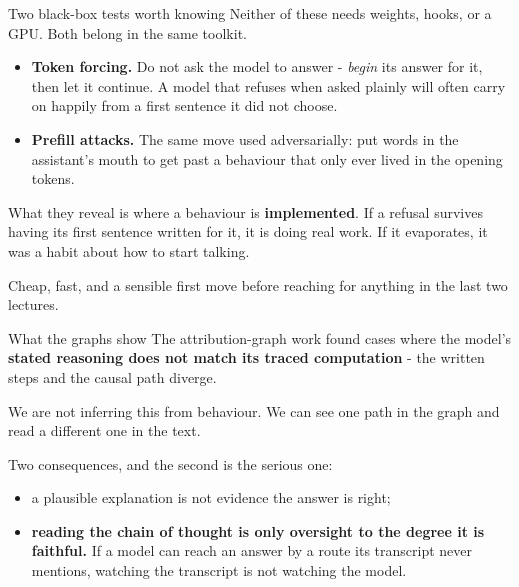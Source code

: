 \documentclass[aspectratio=169]{beamer}
\newcommand{\keybox}[1]{%
  \begin{tcolorbox}[colback=armblue!8, colframe=armblue, boxrule=0.6pt, arc=2pt]
  #1
  \end{tcolorbox}}
\begin{document}
\begin{frame}{Two black-box tests worth knowing}
  \vspace{0.5em}
  Neither of these needs weights, hooks, or a GPU. Both belong in the same toolkit.

  \vspace{0.7em}
  \begin{itemize}
    \item \textbf{Token forcing.} Do not ask the model to answer - \emph{begin} its answer for
      it, then let it continue. A model that refuses when asked plainly will often carry on
      happily from a first sentence it did not choose.
    \item \textbf{Prefill attacks.} The same move used adversarially: put words in the
      assistant's mouth to get past a behaviour that only ever lived in the opening tokens.
  \end{itemize}

  \vspace{0.8em}
  \keybox{What they reveal is where a behaviour is \textbf{implemented}. If a refusal survives
  having its first sentence written for it, it is doing real work. If it evaporates, it was a
  habit about how to start talking.}

  \vspace{0.6em}
  {\footnotesize Cheap, fast, and a sensible first move before reaching for anything in the last
  two lectures.}
\end{frame}

\begin{frame}{What the graphs show}
  \vspace{0.8em}
  The attribution-graph work found cases where the model's \textbf{stated reasoning does not
  match its traced computation} - the written steps and the causal path diverge.

  \vspace{1.0em}
  \keybox{We are not inferring this from behaviour. We can see one path in the graph and read a
  different one in the text.}

  \vspace{1.0em}
  Two consequences, and the second is the serious one:

  \vspace{0.5em}
  \begin{itemize}
    \item a plausible explanation is not evidence the answer is right;
    \item \textbf{reading the chain of thought is only oversight to the degree it is faithful.}
      If a model can reach an answer by a route its transcript never mentions, watching the
      transcript is not watching the model.
  \end{itemize}
\end{frame}
\end{document}
